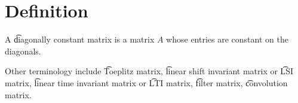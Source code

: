 
\section*{Definition}

A \t{diagonally constant matrix} is a matrix $A$ whose entries are constant on the diagonals.

Other terminology include \t{Toeplitz matrix}, \t{linear shift invariant matrix} or \t{LSI matrix}, \t{linear time invariant matrix} or \t{LTI matrix}, \t{filter matrix}, \t{convolution matrix}.

\blankpage